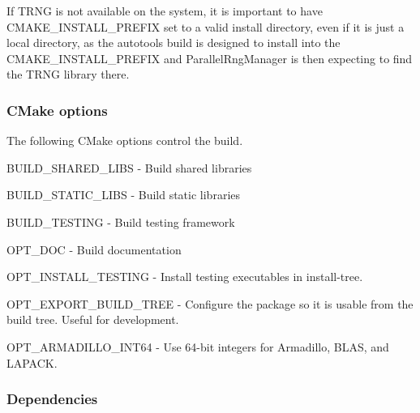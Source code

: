 If T\-R\-N\-G is not available on the system, it is important to have {\ttfamily C\-M\-A\-K\-E\-\_\-\-I\-N\-S\-T\-A\-L\-L\-\_\-\-P\-R\-E\-F\-I\-X} set to a valid install directory, even if it is just a local directory, as the autotools build is designed to install into the {\ttfamily C\-M\-A\-K\-E\-\_\-\-I\-N\-S\-T\-A\-L\-L\-\_\-\-P\-R\-E\-F\-I\-X} and Parallel\-Rng\-Manager is then expecting to find the T\-R\-N\-G library there.

\subsubsection*{C\-Make options}

The following C\-Make options control the build.
\begin{DoxyItemize}
\item {\ttfamily B\-U\-I\-L\-D\-\_\-\-S\-H\-A\-R\-E\-D\-\_\-\-L\-I\-B\-S} -\/ Build shared libraries
\item {\ttfamily B\-U\-I\-L\-D\-\_\-\-S\-T\-A\-T\-I\-C\-\_\-\-L\-I\-B\-S} -\/ Build static libraries
\item {\ttfamily B\-U\-I\-L\-D\-\_\-\-T\-E\-S\-T\-I\-N\-G} -\/ Build testing framework
\item {\ttfamily O\-P\-T\-\_\-\-D\-O\-C} -\/ Build documentation
\item {\ttfamily O\-P\-T\-\_\-\-I\-N\-S\-T\-A\-L\-L\-\_\-\-T\-E\-S\-T\-I\-N\-G} -\/ Install testing executables in install-\/tree.
\item {\ttfamily O\-P\-T\-\_\-\-E\-X\-P\-O\-R\-T\-\_\-\-B\-U\-I\-L\-D\-\_\-\-T\-R\-E\-E} -\/ Configure the package so it is usable from the build tree. Useful for development.
\item {\ttfamily O\-P\-T\-\_\-\-A\-R\-M\-A\-D\-I\-L\-L\-O\-\_\-\-I\-N\-T64} -\/ Use 64-\/bit integers for Armadillo, B\-L\-A\-S, and L\-A\-P\-A\-C\-K.
\end{DoxyItemize}

\subsubsection*{Dependencies}

